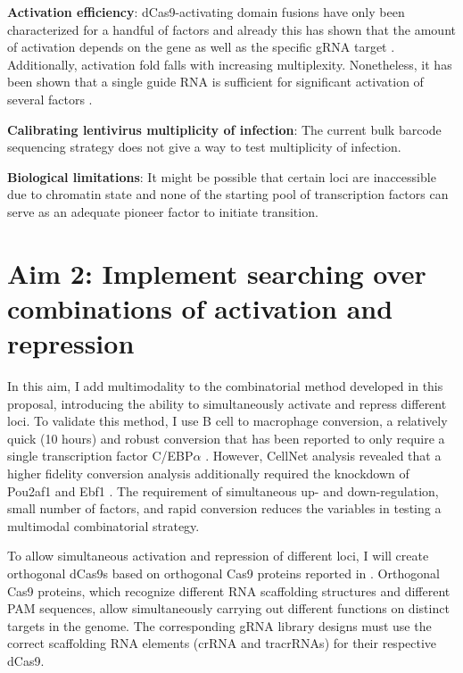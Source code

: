 \documentclass[10pt]{article}
\begin{document}
\textbf{Activation efficiency}: dCas9-activating domain fusions have only been characterized for a handful of factors and already this has shown that the amount of activation depends on the gene as well as the specific gRNA target \cite{chavez2015VPR, konermann2014genome}. Additionally, activation fold falls with increasing multiplexity. Nonetheless, it has been shown that a single guide RNA is sufficient for significant activation of several factors \cite{konermann2014genome}.

\noindent \textbf{Calibrating lentivirus multiplicity of infection}: The current bulk barcode sequencing strategy does not give a way to test multiplicity of infection.

\noindent \textbf{Biological limitations}: It might be possible that certain loci are inaccessible due to chromatin state and none of the starting pool of transcription factors can serve as an adequate pioneer factor to initiate transition.

\section{Aim 2: Implement searching over combinations of activation and repression}

In this aim, I add multimodality to the combinatorial method developed in this proposal, introducing the ability to simultaneously activate and repress different loci. To validate this method, I use  B cell to macrophage conversion, a relatively quick (10 hours) and robust conversion that has been reported to only require a single transcription factor C/EBP$\alpha$ \cite{bussmann2009robust}. However, CellNet analysis revealed that a higher fidelity conversion analysis additionally required the knockdown of Pou2af1 and Ebf1 \cite{morris2014dissecting}. The requirement of simultaneous up- and down-regulation, small number of factors, and rapid conversion reduces the variables in testing a multimodal combinatorial strategy.

To allow simultaneous activation and repression of different loci, I will create orthogonal dCas9s based on orthogonal Cas9 proteins reported in \cite{esvelt2013orthogonal}. Orthogonal Cas9 proteins, which recognize different RNA scaffolding structures and different PAM sequences, allow simultaneously carrying out different functions on distinct targets in the genome. The corresponding gRNA library designs must use the correct scaffolding RNA elements (crRNA and tracrRNAs) for their respective dCas9.
\end{document}
